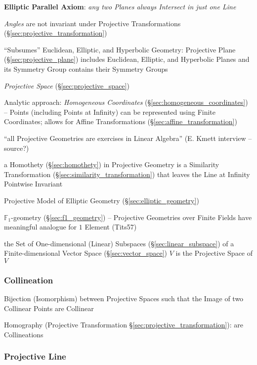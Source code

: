 \textbf{Elliptic Parallel Axiom}: \emph{any two Planes always Intersect in just
  one Line}

\emph{Angles} are not invariant under Projective Transformations
(\S\ref{sec:projective_transformation})

``Subsumes'' Euclidean, Elliptic, and Hyperbolic Geometry: Projective
Plane (\S\ref{sec:projective_plane}) includes Euclidean, Elliptic, and
Hyperbolic Planes and its Symmetry Group contains their Symmetry
Groups

\emph{Projective Space} (\S\ref{sec:projective_space})

Analytic approach: \emph{Homogeneous Coordinates}
(\S\ref{sec:homogeneous_coordinates}) -- Points (including Points at Infinity)
can be represented using Finite Coordinates; allows for Affine Transformations
(\S\ref{sec:affine_transformation}) %

``all Projective Geometries are exercises in Linear Algebra'' (E.
Kmett interview -- source?) %

a Homothety (\S\ref{sec:homothety}) in Projective Geometry is a Similarity
Transformation (\S\ref{sec:similarity_transformation}) that leaves the Line at
Infinity Pointwise Invariant

Projective Model of Elliptic Geometry (\S\ref{sec:elliptic_geometry})

\fist $\mathbb{F}_1$-geometry (\S\ref{sec:f1_geometry}) -- Projective Geometries
over Finite Fields have meaningful analogue for $1$ Element (Tits57)

\fist the Set of One-dimensional (Linear) Subspaces
(\S\ref{sec:linear_subspace}) of a Finite-dimensional Vector Space
(\S\ref{sec:vector_space}) $V$ is the Projective Space of $V$



\subsubsection{Collineation}\label{sec:collineation}

Bijection (Isomorphism) between Projective Spaces such that the Image of two
Collinear Points are Collinear

\fist Homography (Projective Transformation
\S\ref{sec:projective_transformation}): are Collineations %



\subsubsection{Projective Line}\label{sec:projective_line}

